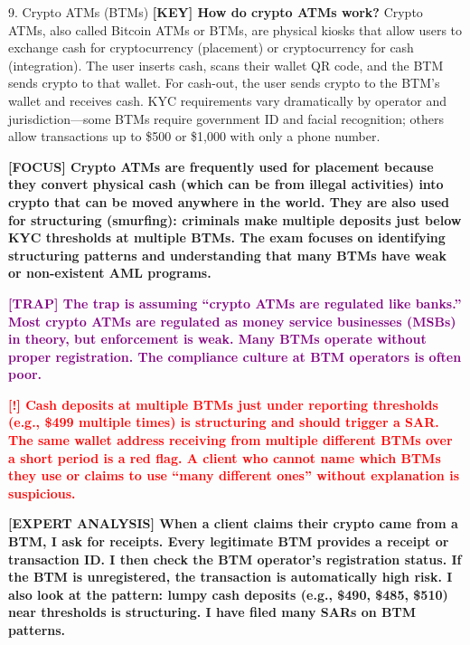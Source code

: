 \documentclass[11pt,a4paper]{beamer}
\newcommand{\redflag}[1]{\textcolor{red}{\textbf{[!] #1}}}
\newcommand{\examfocus}[1]{\textcolor{orange!80!black}{\textbf{[FOCUS] #1}}}
\newcommand{\trap}[1]{\textcolor{purple}{\textbf{[TRAP] #1}}}
\newcommand{\keyterm}[1]{\textcolor{red!80!black}{\textbf{[KEY] #1}}}
\newcommand{\expert}[1]{\textcolor{blue!70!black}{\textbf{[EXPERT ANALYSIS] #1}}}
\begin{document}
	\begin{frame}{9. Crypto ATMs (BTMs)}
		\tiny
		\keyterm{How do crypto ATMs work?} Crypto ATMs, also called Bitcoin ATMs or BTMs, are physical kiosks that allow users to exchange cash for cryptocurrency (placement) or cryptocurrency for cash (integration). The user inserts cash, scans their wallet QR code, and the BTM sends crypto to that wallet. For cash-out, the user sends crypto to the BTM's wallet and receives cash. KYC requirements vary dramatically by operator and jurisdiction—some BTMs require government ID and facial recognition; others allow transactions up to \$500 or \$1,000 with only a phone number.
		
		\vspace{0.1cm}
		\examfocus{Crypto ATMs are frequently used for placement because they convert physical cash (which can be from illegal activities) into crypto that can be moved anywhere in the world. They are also used for structuring (smurfing): criminals make multiple deposits just below KYC thresholds at multiple BTMs. The exam focuses on identifying structuring patterns and understanding that many BTMs have weak or non-existent AML programs.}
		
		\vspace{0.1cm}
		\trap{The trap is assuming “crypto ATMs are regulated like banks.” Most crypto ATMs are regulated as money service businesses (MSBs) in theory, but enforcement is weak. Many BTMs operate without proper registration. The compliance culture at BTM operators is often poor.}
		
		\vspace{0.1cm}
		\redflag{Cash deposits at multiple BTMs just under reporting thresholds (e.g., \$499 multiple times) is structuring and should trigger a SAR. The same wallet address receiving from multiple different BTMs over a short period is a red flag. A client who cannot name which BTMs they use or claims to use “many different ones” without explanation is suspicious.}
		
		\vspace{0.1cm}
		\expert{When a client claims their crypto came from a BTM, I ask for receipts. Every legitimate BTM provides a receipt or transaction ID. I then check the BTM operator's registration status. If the BTM is unregistered, the transaction is automatically high risk. I also look at the pattern: lumpy cash deposits (e.g., \$490, \$485, \$510) near thresholds is structuring. I have filed many SARs on BTM patterns.}
	\end{frame}
	
\end{document}
